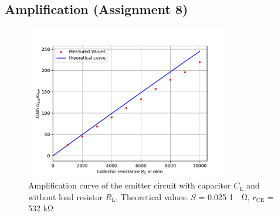 \documentclass[11pt, a4paper]{article}
\begin{document}
\FloatBarrier
\subsection{Amplification (Assignment 8)}
\begin{figure}[h]
    \centering
    \includegraphics[width=0.8\textwidth]{plots/RC1.pdf}
    \caption{Amplification curve of the emitter circuit with capacitor $C_{\text{E}}$ and without load resistor $R_{\text{L}}$. Theoretical values: $S$ = 0.025 \si{1 \per \ohm}, $r_{\text{CE}}$ = 532 \si{\kilo\ohm}}
    \label{fig:RC1}
\end{figure}
\end{document}
